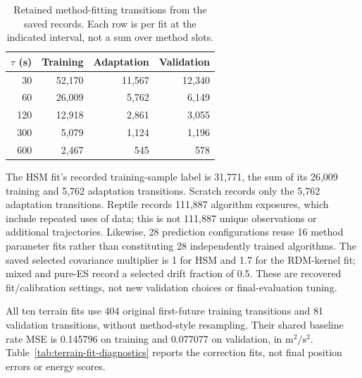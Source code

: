 \begin{table}[htbp]
\centering\small
\caption{Retained method-fitting transitions from the saved records.
Each row is per fit at the indicated interval, not a sum over method slots.}
\label{tab:fit-transition-counts}\hypertarget{tab:fit-transition-counts}{}
\begin{tabular}{rrrr}
\toprule
\(\tau\) (s) & Training & Adaptation & Validation\\
\midrule
30 & 52,170 & 11,567 & 12,340\\
60 & 26,009 & 5,762 & 6,149\\
120 & 12,918 & 2,861 & 3,055\\
300 & 5,079 & 1,124 & 1,196\\
600 & 2,467 & 545 & 578\\
\bottomrule
\end{tabular}
\end{table}

The HSM fit's recorded training-sample label is 31,771, the sum of its
26,009 training and 5,762 adaptation transitions. Scratch records only the
5,762 adaptation transitions. Reptile records 111,887 algorithm exposures,
which include repeated uses of data; this is not 111,887 unique observations
or additional trajectories. Likewise, 28 prediction configurations reuse
16 method parameter fits rather than constituting 28 independently trained
algorithms. The saved selected covariance multiplier is 1 for HSM and 1.7
for the RDM-kernel fit; mixed and pure-ES record a selected drift fraction
of 0.5. These are recovered fit/calibration settings, not new validation
choices or final-evaluation tuning.

All ten terrain fits use 404 original first-future training transitions and
81 validation transitions, without method-style resampling. Their shared
baseline rate MSE is 0.145796 on training and 0.077077 on validation, in
\(\mathrm{m}^2/\mathrm{s}^2\). Table~\ref{tab:terrain-fit-diagnostics}
reports the correction fits, not final position errors or energy scores.

